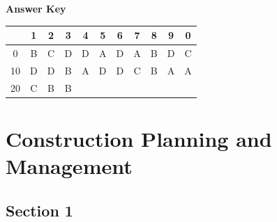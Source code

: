 \documentclass[11pt,a4paper]{article}
\begin{document}
\textbf{Answer Key}
\begin{tabular}{ | c | c c c c c c c c c c | }
\hline
 & 1 & 2 & 3 & 4 & 5 & 6 & 7 & 8 & 9 & 0 \\
\hline
0 & B & C & D & D & A & D & A & B & D & C \\
10 & D & D & B & A & D & D & C & B & A & A \\
20 & C & B & B &   &   &   &   &   &   &   \\
\hline
\end{tabular}
\clearpage
\section{Construction Planning and Management}
\subsection*{Section 1}
\end{document}
